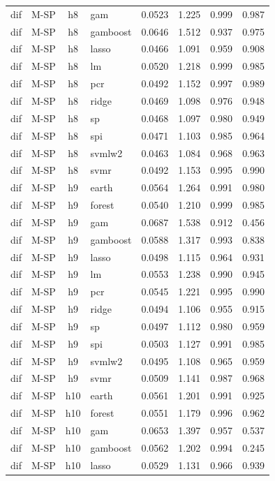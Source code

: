 \begin{ThreePartTable}
\begin{longtable}[t]{llclcccc}
dif & M-SP & h8 & gam & 0.0523 & 1.225 & 0.999 & 0.987\\
dif & M-SP & h8 & gamboost & 0.0646 & 1.512 & 0.937 & 0.975\\
dif & M-SP & h8 & lasso & 0.0466 & 1.091 & 0.959 & 0.908\\
dif & M-SP & h8 & lm & 0.0520 & 1.218 & 0.999 & 0.985\\
dif & M-SP & h8 & pcr & 0.0492 & 1.152 & 0.997 & 0.989\\
dif & M-SP & h8 & ridge & 0.0469 & 1.098 & 0.976 & 0.948\\
dif & M-SP & h8 & sp & 0.0468 & 1.097 & 0.980 & 0.949\\
dif & M-SP & h8 & spi & 0.0471 & 1.103 & 0.985 & 0.964\\
dif & M-SP & h8 & svmlw2 & 0.0463 & 1.084 & 0.968 & 0.963\\
dif & M-SP & h8 & svmr & 0.0492 & 1.153 & 0.995 & 0.990\\
\addlinespace
dif & M-SP & h9 & earth & 0.0564 & 1.264 & 0.991 & 0.980\\
dif & M-SP & h9 & forest & 0.0540 & 1.210 & 0.999 & 0.985\\
dif & M-SP & h9 & gam & 0.0687 & 1.538 & 0.912 & 0.456\\
dif & M-SP & h9 & gamboost & 0.0588 & 1.317 & 0.993 & 0.838\\
dif & M-SP & h9 & lasso & 0.0498 & 1.115 & 0.964 & 0.931\\
dif & M-SP & h9 & lm & 0.0553 & 1.238 & 0.990 & 0.945\\
dif & M-SP & h9 & pcr & 0.0545 & 1.221 & 0.995 & 0.990\\
dif & M-SP & h9 & ridge & 0.0494 & 1.106 & 0.955 & 0.915\\
dif & M-SP & h9 & sp & 0.0497 & 1.112 & 0.980 & 0.959\\
dif & M-SP & h9 & spi & 0.0503 & 1.127 & 0.991 & 0.985\\
dif & M-SP & h9 & svmlw2 & 0.0495 & 1.108 & 0.965 & 0.959\\
dif & M-SP & h9 & svmr & 0.0509 & 1.141 & 0.987 & 0.968\\
\addlinespace
dif & M-SP & h10 & earth & 0.0561 & 1.201 & 0.991 & 0.925\\
dif & M-SP & h10 & forest & 0.0551 & 1.179 & 0.996 & 0.962\\
dif & M-SP & h10 & gam & 0.0653 & 1.397 & 0.957 & 0.537\\
dif & M-SP & h10 & gamboost & 0.0562 & 1.202 & 0.994 & 0.245\\
dif & M-SP & h10 & lasso & 0.0529 & 1.131 & 0.966 & 0.939\\

\end{longtable}
\end{ThreePartTable}
